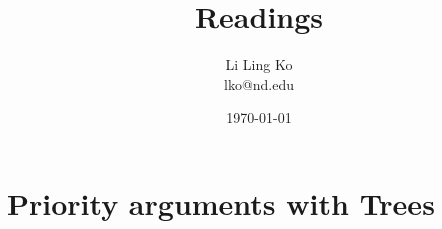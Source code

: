 \documentclass{article}
\begin{document}
\title{Readings}
\author{Li Ling Ko\\ lko@nd.edu}
\date{\today}
\maketitle

%
%
%

%
\section{Priority arguments with Trees}
%
\end{document}
